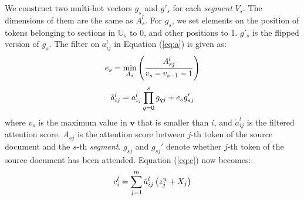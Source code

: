 We construct two multi-hot vectors $g_{s}$ and $g'_{s}$ for each \textit{segment} $V_{s}$.
The dimensions of them are the
same as $A_{s}^{l}$. For $g_{s}$, we set elements on the position of tokens
belonging to sections in $\mathbb{U}_{s}$ to 0, and other
positions to 1. $g'_{s}$ is the flipped version of $g_{s}$. 
The filter on $a_{ij}^{l}$ in Equation (\ref{eq:a}) is given as:
\begin{equation}
\small
    e_{s} = \min \limits_{A_{s}}\left(\frac{A_{sj}^{l}}{v_{s}-v_{s-1}-1}\right)
\end{equation}
\begin{equation}
\small
    \tilde{a}_{ij}^{l} = a_{ij}^{l}\prod_{q=0}^{s}g_{qj} + e_{s}g_{sj}'
\end{equation}
where $v_{s}$ is the maximum value in 
$\mathbf{v}$ that is smaller than $i$, and $\tilde{a}_{ij}^l$ is the filtered
attention score. $A_{sj}$ is the attention score between $j$-th token
of the source document and the $s$-th \textit{segment}. 
$g_{sj}$ and $g_{sj}'$ denote whether $j$-th token
of the source document has been attended.
Equation (\ref{eq:c}) now becomes:
\begin{equation}
\small
    c _ { i } ^ { l } = \sum _ { j = 1 } ^ { m } \tilde{a}_{ij}^{l} \left( z _ { j } ^ { u } + X_j \right)
\end{equation}



